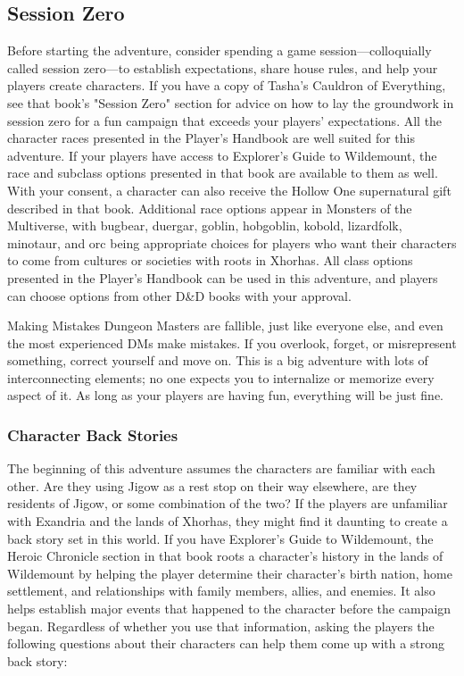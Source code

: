 \documentclass[10pt,a4paper,twoside,bg=print,twocolumn,openany,nodeprecatedcode]{dndbook}
\begin{document}
\subsection{Session Zero}
Before starting the adventure, consider spending a game session—colloquially called session zero—to establish expectations, share house rules, and help your players create characters. If you have a copy of Tasha's Cauldron of Everything, see that book's "Session Zero" section for advice on how to lay the groundwork in session zero for a fun campaign that exceeds your players' expectations.
All the character races presented in the Player's Handbook are well suited for this adventure. If your players have access to Explorer's Guide to Wildemount, the race and subclass options presented in that book are available to them as well. With your consent, a character can also receive the Hollow One supernatural gift described in that book.
Additional race options appear in Monsters of the Multiverse, with bugbear, duergar, goblin, hobgoblin, kobold, lizardfolk, minotaur, and orc being appropriate choices for players who want their characters to come from cultures or societies with roots in Xhorhas.
All class options presented in the Player's Handbook can be used in this adventure, and players can choose options from other D\&D books with your approval.
\begin{DndSidebar}[float=!b]{Making Mistakes}
Dungeon Masters are fallible, just like everyone else, and even the most experienced DMs make mistakes. If you overlook, forget, or misrepresent something, correct yourself and move on. This is a big adventure with lots of interconnecting elements; no one expects you to internalize or memorize every aspect of it. As long as your players are having fun, everything will be just fine.


\end{DndSidebar}

\subsubsection{Character Back Stories}
The beginning of this adventure assumes the characters are familiar with each other. Are they using Jigow as a rest stop on their way elsewhere, are they residents of Jigow, or some combination of the two?
If the players are unfamiliar with Exandria and the lands of Xhorhas, they might find it daunting to create a back story set in this world. If you have Explorer's Guide to Wildemount, the Heroic Chronicle section in that book roots a character's history in the lands of Wildemount by helping the player determine their character's birth nation, home settlement, and relationships with family members, allies, and enemies. It also helps establish major events that happened to the character before the campaign began.
Regardless of whether you use that information, asking the players the following questions about their characters can help them come up with a strong back story:
\end{document}
